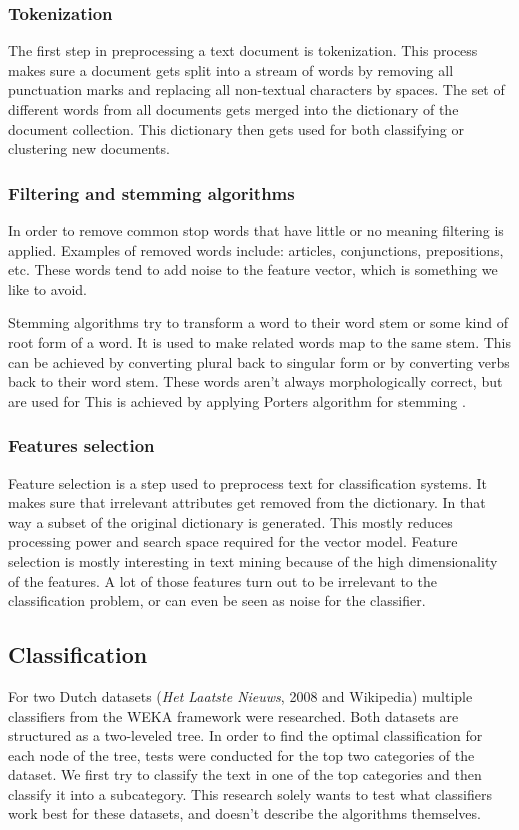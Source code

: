 \documentclass[twocolumn]{phdsymp} %
\begin{document}
\subsubsection{Tokenization}
The first step in preprocessing a text document is tokenization. This process makes sure a document gets split into a stream of words by removing all punctuation marks and replacing all non-textual characters by spaces. The set of different words from all documents gets merged into the dictionary of the document collection. This dictionary then gets used for both classifying or clustering new documents.

\subsubsection{Filtering and stemming algorithms}
In order to remove common stop words that have little or no meaning filtering is applied. Examples of removed words include: articles, conjunctions, prepositions, etc. These words tend to add noise to the feature vector, which is something we like to avoid.

Stemming algorithms try to transform a word to their word stem or some kind of root form of a word. It is used to make related words map to the same stem. This can be achieved by converting plural back to singular form or by converting verbs back to their word stem. These words aren't always morphologically correct, but are used for  This is achieved by applying Porters algorithm for stemming \cite{Porter1980}.  

\subsubsection{Features selection}
Feature selection is a step used to preprocess text for classification systems. It makes sure that irrelevant attributes get removed from the dictionary. In that way a subset of the original dictionary is generated. This mostly reduces processing power and search space required for the vector model. Feature selection is mostly interesting in text mining because of the high dimensionality of the features. A lot of those features turn out to be irrelevant to the classification problem, or can even be seen as noise for the classifier.

\subsection{Classification}
For two Dutch datasets (\textit{Het Laatste Nieuws}, 2008 and Wikipedia) multiple classifiers from the WEKA framework \cite{Hall2009} were researched. Both datasets are structured as a two-leveled tree. In order to find the optimal classification for each node of the tree, tests were conducted for the top two categories of the dataset. We first try to classify the text in one of the top categories and then classify it into a subcategory. This research solely wants to test what classifiers work best for these datasets, and doesn't describe the algorithms themselves. 
\end{document}
